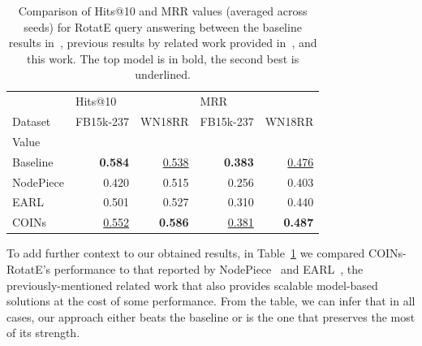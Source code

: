 \begin{table}[ht!]
  \caption[Comparison of Hits@10 and MRR values for query answering between the RotatE baseline, NodePiece, EARL, and COINs.]{Comparison of Hits@10 and MRR values (averaged across seeds) for RotatE query answering between the baseline results in~\cite{sun_rotate_2019}, previous results by related work provided in~\cite{chen_entity-agnostic_2023}, and this work. The top model is in bold, the second best is underlined.}
  \label{tab:performance_query_answering_related_work}
  \centering
\begin{tabular}{lrrrr}
\toprule
{} & \multicolumn{2}{l}{Hits@10} & \multicolumn{2}{l}{MRR} \\
Dataset & FB15k-237 & WN18RR & FB15k-237 & WN18RR \\
Value     &           &        &           &        \\
\midrule
Baseline  &     \textbf{0.584} &  \underline{0.538} &  \textbf{0.383} &  \underline{0.476} \\
NodePiece &     0.420 &  0.515 &     0.256 &  0.403 \\
EARL      &     0.501 &  0.527 &     0.310 &  0.440 \\
COINs     &     \underline{0.552} &  \textbf{0.586} &     \underline{0.381} &  \textbf{0.487} \\
\bottomrule
\end{tabular}
\end{table}
To add further context to our obtained results, in Table~\ref{tab:performance_query_answering_related_work} we compared COINs-RotatE's performance to that reported by NodePiece~\cite{galkin_nodepiece_2022} and EARL~\cite{chen_entity-agnostic_2023}, the previously-mentioned related work that also provides scalable model-based solutions at the cost of some performance. From the table, we can infer that in all cases, our approach either beats the baseline or is the one that preserves the most of its strength.

